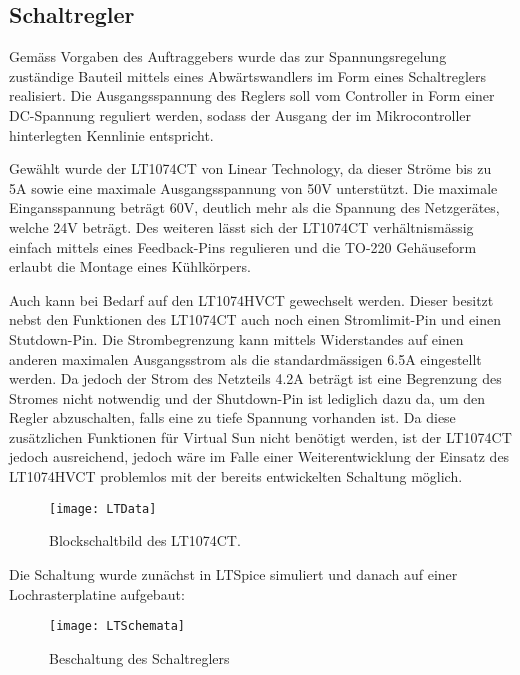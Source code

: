 %
%

\subsection{Schaltregler}\label{schaltregler}

Gemäss Vorgaben des Auftraggebers wurde das zur Spannungsregelung zuständige Bauteil mittels eines Abwärtswandlers im Form eines Schaltreglers realisiert. Die Ausgangsspannung des Reglers soll vom Controller in Form einer DC-Spannung reguliert werden, sodass der Ausgang der im Mikrocontroller hinterlegten Kennlinie entspricht. 

Gewählt wurde der LT1074CT von Linear Technology, da dieser Ströme bis zu 5A sowie eine maximale Ausgangsspannung von 50V unterstützt. Die maximale Eingansspannung beträgt 60V, deutlich mehr als die Spannung des Netzgerätes, welche 24V beträgt.
Des weiteren lässt sich der LT1074CT verhältnismässig einfach mittels eines Feedback-Pins regulieren und die TO-220 Gehäuseform erlaubt die Montage eines Kühlkörpers.

Auch kann bei Bedarf auf den LT1074HVCT gewechselt werden. Dieser besitzt nebst den Funktionen des LT1074CT auch noch einen Stromlimit-Pin und einen Stutdown-Pin. Die Strombegrenzung kann mittels Widerstandes auf einen anderen maximalen Ausgangsstrom als die standardmässigen 6.5A eingestellt werden. Da jedoch der Strom des Netzteils 4.2A beträgt ist eine Begrenzung des Stromes nicht notwendig und  der Shutdown-Pin ist lediglich dazu da, um den Regler abzuschalten, falls eine zu tiefe Spannung vorhanden ist. Da diese zusätzlichen Funktionen für Virtual Sun nicht benötigt werden, ist der LT1074CT jedoch ausreichend, jedoch wäre im Falle einer Weiterentwicklung der Einsatz des LT1074HVCT problemlos mit der bereits entwickelten Schaltung möglich.

\begin{figure}[h]
\centering
\texttt{[image: LTData]}%
\caption{Blockschaltbild des LT1074CT.}
\label{fig::LTData}
\end{figure}

Die Schaltung wurde zunächst in LTSpice simuliert und danach auf einer Lochrasterplatine aufgebaut:

\begin{figure}[h]
\centering
\texttt{[image: LTSchemata]}%
\caption{Beschaltung des Schaltreglers}%
\label{fig::LTSchemata}%
\end{figure}

